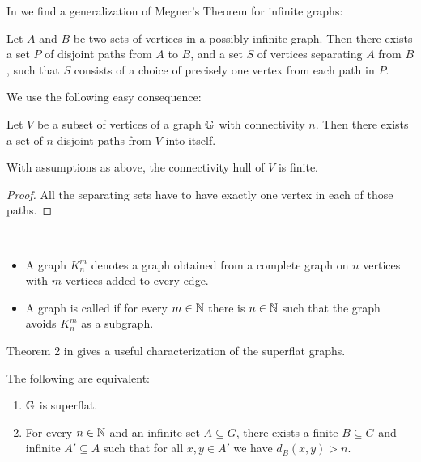 In \cite{infinite_megner} we find a generalization of Megner's Theorem for infinite graphs:

\begin{Theorem} \label{megner}
  Let $A$ and $B$ be two sets of vertices in a possibly infinite graph. Then there exists a set $P$ of disjoint paths from $A$ to $B$, and a set $S$ of vertices separating $A$ from $B$, such that $S$ consists of a choice of precisely one vertex from each path in $P$.
\end{Theorem}

We use the following easy consequence:

\begin{Corollary} \label{cr_disjoint_paths}
  Let $V$ be a subset of vertices of a graph $\mathbb G$ with connectivity $n$. Then there exists a set of $n$ disjoint paths from $V$ into itself.
\end{Corollary}

\begin{Corollary} \label{cr_hull_finite}
  With assumptions as above, the connectivity hull of $V$ is finite.
\end{Corollary}

\begin{proof}
  All the separating sets have to have exactly one vertex in each of those paths. 
\end{proof}

\begin{Definition} \ 
  \begin{itemize}
    \item A graph $K^m_n$ denotes a graph obtained from a complete graph on $n$ vertices with $m$ vertices added to every edge.
    \item A graph is called \defn{superflat} if for every $m \in \mathbb{N}$ there is $n \in \mathbb{N}$ such that the graph avoids $K^m_n$ as a subgraph. 
  \end{itemize}
\end{Definition}

Theorem 2 in \cite{stable_graphs} gives a useful characterization of the superflat graphs.

\begin{Theorem} \label{th_superflat_equivalence}
  The following are equivalent:
  \begin{enumerate}
  \item $\mathbb G$ is superflat.
  \item For every $n \in \mathbb{N}$ and an infinite set $A \subseteq G$, there exists a finite $B \subseteq G$ and infinite $A' \subseteq A$ such that for all $x,y \in A'$ we have $d_{B}(x, y) > n$.
  \end{enumerate}
\end{Theorem}

